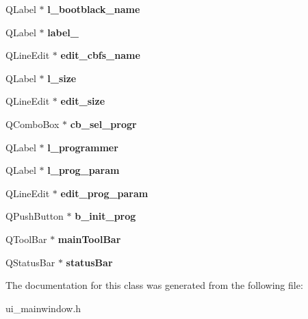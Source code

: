 \begin{DoxyCompactItemize}
\item 
\hypertarget{classUi__MainWindow_a9789b3ba149fc48b9499f53717724919}{Q\-Label $\ast$ {\bfseries l\-\_\-bootblack\-\_\-name}}\label{classUi__MainWindow_a9789b3ba149fc48b9499f53717724919}

\item 
\hypertarget{classUi__MainWindow_a2e2516d755e4dd53fc905dabddf2738a}{Q\-Label $\ast$ {\bfseries label\-\_}}\label{classUi__MainWindow_a2e2516d755e4dd53fc905dabddf2738a}

\item 
\hypertarget{classUi__MainWindow_ae70a8f0d7adf85d25a51a631ef9f0d0f}{Q\-Line\-Edit $\ast$ {\bfseries edit\-\_\-cbfs\-\_\-name}}\label{classUi__MainWindow_ae70a8f0d7adf85d25a51a631ef9f0d0f}

\item 
\hypertarget{classUi__MainWindow_a5ddb567c63c98403128579b8f1aecdf4}{Q\-Label $\ast$ {\bfseries l\-\_\-size}}\label{classUi__MainWindow_a5ddb567c63c98403128579b8f1aecdf4}

\item 
\hypertarget{classUi__MainWindow_aa6f4a6e95d8b144f900f2b5688bf39d9}{Q\-Line\-Edit $\ast$ {\bfseries edit\-\_\-size}}\label{classUi__MainWindow_aa6f4a6e95d8b144f900f2b5688bf39d9}

\item 
\hypertarget{classUi__MainWindow_aaa0bd5d6c810aaf66c7d5842d4e89508}{Q\-Combo\-Box $\ast$ {\bfseries cb\-\_\-sel\-\_\-progr}}\label{classUi__MainWindow_aaa0bd5d6c810aaf66c7d5842d4e89508}

\item 
\hypertarget{classUi__MainWindow_a92874f8d6577fbf029b2825492a4a9b3}{Q\-Label $\ast$ {\bfseries l\-\_\-programmer}}\label{classUi__MainWindow_a92874f8d6577fbf029b2825492a4a9b3}

\item 
\hypertarget{classUi__MainWindow_ae3ae3c73fdcc9027fa07800d29071b6e}{Q\-Label $\ast$ {\bfseries l\-\_\-prog\-\_\-param}}\label{classUi__MainWindow_ae3ae3c73fdcc9027fa07800d29071b6e}

\item 
\hypertarget{classUi__MainWindow_a2ca19c85487f3a52b494bbe1ff9838ab}{Q\-Line\-Edit $\ast$ {\bfseries edit\-\_\-prog\-\_\-param}}\label{classUi__MainWindow_a2ca19c85487f3a52b494bbe1ff9838ab}

\item 
\hypertarget{classUi__MainWindow_a4f25747d8bfe22d1a3abba88dddd5661}{Q\-Push\-Button $\ast$ {\bfseries b\-\_\-init\-\_\-prog}}\label{classUi__MainWindow_a4f25747d8bfe22d1a3abba88dddd5661}

\item 
\hypertarget{classUi__MainWindow_a5172877001c8c7b4e0f6de50421867d1}{Q\-Tool\-Bar $\ast$ {\bfseries main\-Tool\-Bar}}\label{classUi__MainWindow_a5172877001c8c7b4e0f6de50421867d1}

\item 
\hypertarget{classUi__MainWindow_a50fa481337604bcc8bf68de18ab16ecd}{Q\-Status\-Bar $\ast$ {\bfseries status\-Bar}}\label{classUi__MainWindow_a50fa481337604bcc8bf68de18ab16ecd}

\end{DoxyCompactItemize}


The documentation for this class was generated from the following file\-:\begin{DoxyCompactItemize}
\item 
ui\-\_\-mainwindow.\-h\end{DoxyCompactItemize}
